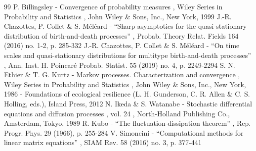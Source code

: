 \documentclass[11pt]{article}
\numberwithin{equation}{section}
\theoremstyle{plain}
\theoremstyle{definition}
\begin{document}

\begin{thebibliography}{99}
 P. Billingsley - Convergence of probability measures , Wiley Series in Probability and Statistics , John Wiley \& Sons, Inc., New York, 1999
 J.-R. Chazottes, P. Collet \& S. Méléard - “Sharp asymptotics for the quasi-stationary distribution of birth-and-death processes” , Probab. Theory Relat. Fields 164 (2016) no. 1-2, p. 285-332
 J.-R. Chazottes, P. Collet \& S. Méléard - “On time scales and quasi-stationary distributions for multitype birth-and-death processes” , Ann. Inst. H. Poincaré Probab. Statist. 55 (2019) no. 4, p. 2249-2294
 S. N. Ethier \& T. G. Kurtz - Markov processes. Characterization and convergence , Wiley Series in Probability and Statistics , John Wiley \& Sons, Inc., New York, 1986
 - Foundations of ecological resilience (L. H. Gunderson, C. R. Allen \& C. S. Holling, eds.), Island Press, 2012
 N. Ikeda \& S. Watanabe - Stochastic differential equations and diffusion processes , vol. 24 , North-Holland Publishing Co., Amsterdam, Tokyo, 1989
 R. Kubo - “The fluctuation-dissipation theorem” , Rep. Progr. Phys. 29 (1966), p. 255-284
 V. Simoncini - “Computational methods for linear matrix equations” , SIAM Rev. 58 (2016) no. 3, p. 377-441
\end{thebibliography}
\end{document}
